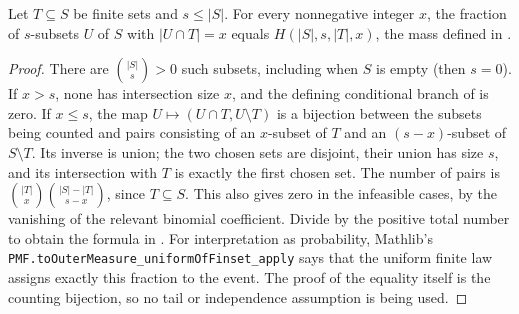 \begin{lemma}
Let $T\subseteq S$ be finite sets and $s\leq |S|$. For every
nonnegative integer $x$, the fraction of $s$-subsets $U$ of $S$
with $|U\cap T|=x$ equals $H(|S|,s,|T|,x)$, the mass defined
in .
\end{lemma}
\begin{proof}
There are $\binom{|S|}{s}>0$ such subsets, including when $S$ is
empty (then $s=0$). If $x>s$, none has intersection size $x$, and
the defining conditional branch of 
is zero. If $x\leq s$, the map
$U\mapsto(U\cap T,U\setminus T)$ is a bijection between the
subsets being counted and pairs consisting of an $x$-subset of $T$
and an $(s-x)$-subset of $S\setminus T$. Its inverse is union;
the two chosen sets are disjoint, their union has size $s$, and its
intersection with $T$ is exactly the first chosen set. The number
of pairs is
$\binom{|T|}{x}\binom{|S|-|T|}{s-x}$, since $T\subseteq S$.
This also gives zero in the infeasible cases, by the vanishing of
the relevant binomial coefficient. Divide by the positive total
number to obtain the formula in .
For interpretation as probability, Mathlib's \texttt{PMF.toOuterMeasure\_uniformOfFinset\_apply}
says that the uniform finite law assigns exactly this fraction to
the event. The proof of the equality itself is the counting bijection,
so no tail or independence assumption is being used.
\end{proof}
